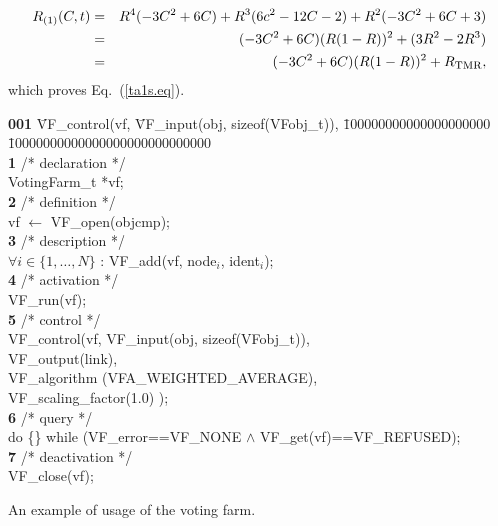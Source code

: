\documentclass[11pt]{article}
\begin{document}
\begin{eqnarray}
R_{(1)} (C,t) &=& R^4(-3C^2+6C) + R^3(6c^2-12C-2)+R^2(-3C^2+6C+3) \nonumber\\
                        &=& (-3C^2 + 6C) (R(1-R))^2 + (3R^2 -2R^3) \nonumber\\
                        &=& (-3C^2 + 6C) (R(1-R))^2 + R_{\hbox{\sc tmr}},\nonumber
\end{eqnarray}
which proves Eq.~(\ref{ta1s.eq}).

\vfill\eject



\begin{table}[h]
\begin{small}
\begin{sf}
\vspace*{-52pt}
\begin{tabbing}
{\bf 001} \= VF\_control(vf, \=VF\_input(obj, sizeof(VFobj\_t)), \= 100000000000000000000 \= 10000000000000000000000000000 \kill\\
{\bf 1} \>  /* declaration */\\
        \> VotingFarm\_t *vf;\\
{\bf 2} \> /* definition */\\
        \> vf $\leftarrow$ VF\_open(objcmp);\\
{\bf 3} \> /* description */\\
        \> $\forall i\in\{1,\ldots,N\}$ : VF\_add(vf, node${}_i$, ident${}_i$);\\
{\bf 4} \> /* activation */\\
        \> VF\_run(vf); \\
{\bf 5} \> /* control */\\
        \> VF\_control(vf, VF\_input(obj, sizeof(VFobj\_t)), \\
	\>\>		   VF\_output(link),\\
	\>\>		   VF\_algorithm (VFA\_WEIGHTED\_AVERAGE),\\
	\>\>		   VF\_scaling\_factor(1.0) );\\
{\bf 6} \> /* query */\\
        \> do \{\} while (VF\_error==VF\_NONE \hskip10pt $\wedge$ \hskip10pt VF\_get(vf)==VF\_REFUSED);\\
{\bf 7} \> /* deactivation */\\
        \> VF\_close(vf);
\end{tabbing}
\vspace*{-15pt}
\end{sf}
\end{small}
\caption{An example of usage of the voting farm.}
\label{example}
\end{table}
\end{document}
